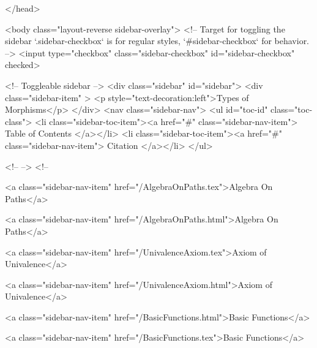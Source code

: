   
</head>




  <body class="layout-reverse sidebar-overlay">
    <!-- Target for toggling the sidebar `.sidebar-checkbox` is for regular
     styles, `#sidebar-checkbox` for behavior. -->
<input type="checkbox" class="sidebar-checkbox" id="sidebar-checkbox" checked>

<!-- Toggleable sidebar -->
<div class="sidebar" id="sidebar">
  <div class="sidebar-item" >
    <p style="text-decoration:left">Types of Morphisms</p>
  </div>
  <nav class="sidebar-nav">
    <ul id="toc-id" class="toc-class">
  <li class="sidebar-toc-item"><a href="#" class="sidebar-nav-item"> Table of Contents </a></li>
  <li class="sidebar-toc-item"><a href="#" class="sidebar-nav-item"> Citation </a></li>
</ul>


    <!--  -->
    <!-- 
      
    
      
    
      
    
      
        
      
    
      
        
          <a class="sidebar-nav-item" href="/AlgebraOnPaths.tex">Algebra On Paths</a>
        
      
    
      
        
          <a class="sidebar-nav-item" href="/AlgebraOnPaths.html">Algebra On Paths</a>
        
      
    
      
        
          <a class="sidebar-nav-item" href="/UnivalenceAxiom.tex">Axiom of Univalence</a>
        
      
    
      
        
          <a class="sidebar-nav-item" href="/UnivalenceAxiom.html">Axiom of Univalence</a>
        
      
    
      
        
          <a class="sidebar-nav-item" href="/BasicFunctions.html">Basic Functions</a>
        
      
    
      
        
          <a class="sidebar-nav-item" href="/BasicFunctions.tex">Basic Functions</a>
        
      
    
